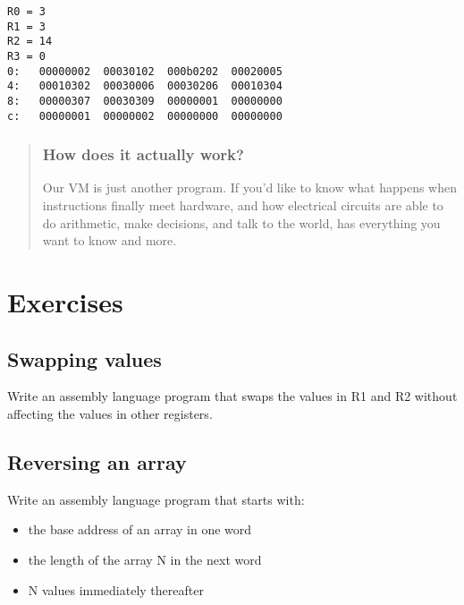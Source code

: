 \documentclass[krantzl]{krantz}
\newenvironment{callout}{\savenotes\begin{tBox}\begin{quotation}\toggletrue{inbox}\renewcommand{\thempfootnote}{\arabic{footnote}}}{\end{quotation}\vspace{\baselineskip}\end{tBox}\togglefalse{inbox}\spewnotes}
\begin{document}
\begin{lstlisting}[frame=tblr,backgroundcolor=\color{black!5}]
R0 = 3
R1 = 3
R2 = 14
R3 = 0
0:   00000002  00030102  000b0202  00020005
4:   00010302  00030006  00030206  00010304
8:   00000307  00030309  00000001  00000000
c:   00000001  00000002  00000000  00000000
\end{lstlisting}


\begin{callout}


\subsubsection*{How does it actually work?}


Our VM is just another program.
If you’d like to know what happens when instructions finally meet hardware,
and how electrical circuits are able to do arithmetic,
make decisions,
and talk to the world,
\cite{Patterson2017} has everything you want to know and more.

\end{callout}

\section{Exercises}\label{virtual-machine-exercises}

\subsection*{Swapping values}


Write an assembly language program that swaps the values in R1 and R2
without affecting the values in other registers.

\subsection*{Reversing an array}


Write an assembly language program that starts with:

\begin{itemize}

\item the base address of an array in one word

\item the length of the array N in the next word

\item N values immediately thereafter

\end{itemize}
\end{document}
